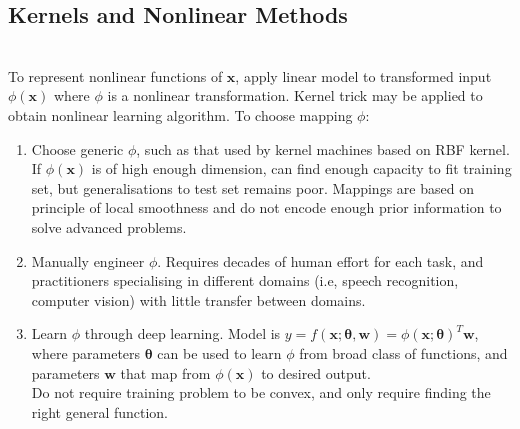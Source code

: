 \subsection{Kernels and Nonlinear Methods}

\begin{remark} \\
To represent nonlinear functions of $\bm{x}$, apply linear model to transformed input $\phi(\bm{x})$ where $\phi$ is a nonlinear transformation. Kernel trick may be applied to obtain nonlinear learning algorithm. To choose mapping $\phi$:
\begin{enumerate}[label=\roman*.]
\setlength{\itemsep}{0pt}
\item Choose generic $\phi$, such as that used by kernel machines based on RBF kernel.\\
If $\phi(\bm{x})$ is of high enough dimension, can find enough capacity to fit training set, but generalisations to test set remains poor. Mappings are based on principle of local smoothness and do not encode enough prior information to solve advanced problems.
\item Manually engineer $\phi$. Requires decades of human effort for each task, and practitioners specialising in different domains (i.e, speech recognition, computer vision) with little transfer between domains.
\item Learn $\phi$ through deep learning. Model is $y = f(\bm{x}; \bm{\theta}, \bm{w}) = \phi(\bm{x}; \bm{\theta})^T \bm{w}$, where parameters $\bm{\theta}$ can be used to learn $\phi$ from broad class of functions, and parameters $\bm{w}$ that map from $\phi(\bm{x})$ to desired output.\\
Do not require training problem to be convex, and only require finding the right general function.
\end{enumerate}
\end{remark}
